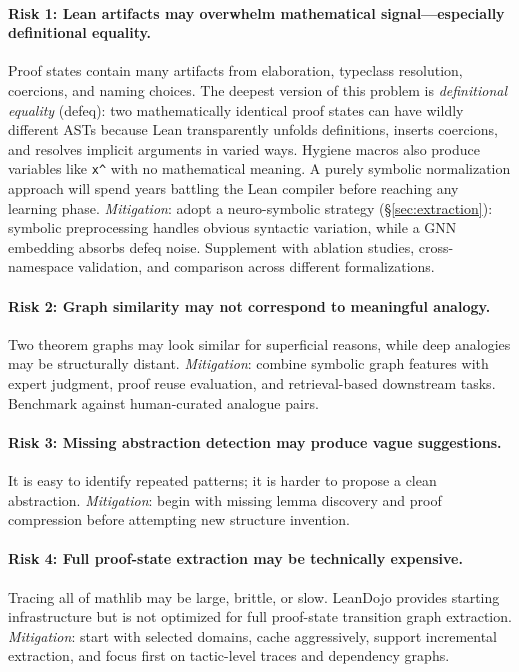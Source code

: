 \documentclass[12pt, a4paper]{article}
\begin{document}
\paragraph{Risk 1: Lean artifacts may overwhelm mathematical signal---especially definitional equality.}
Proof states contain many artifacts from elaboration, typeclass resolution,
coercions, and naming choices. The deepest version of this problem is
\emph{definitional equality} (defeq): two mathematically identical proof states
can have wildly different ASTs because Lean transparently unfolds definitions,
inserts coercions, and resolves implicit arguments in varied ways. Hygiene
macros also produce variables like \texttt{x\textasciicircum} with no
mathematical meaning. A purely symbolic normalization approach will spend
years battling the Lean compiler before reaching any learning phase.
\textit{Mitigation}: adopt a neuro-symbolic strategy (\S\ref{sec:extraction}):
symbolic preprocessing handles obvious syntactic variation, while a GNN
embedding absorbs defeq noise. Supplement with ablation studies,
cross-namespace validation, and comparison across different formalizations.

\paragraph{Risk 2: Graph similarity may not correspond to meaningful analogy.}
Two theorem graphs may look similar for superficial reasons, while deep
analogies may be structurally distant.
\textit{Mitigation}: combine symbolic graph features with expert judgment,
proof reuse evaluation, and retrieval-based downstream tasks. Benchmark
against human-curated analogue pairs.

\paragraph{Risk 3: Missing abstraction detection may produce vague suggestions.}
It is easy to identify repeated patterns; it is harder to propose a clean
abstraction.
\textit{Mitigation}: begin with missing lemma discovery and proof compression
before attempting new structure invention.

\paragraph{Risk 4: Full proof-state extraction may be technically expensive.}
Tracing all of mathlib may be large, brittle, or slow. LeanDojo
\citep{yang2023leandojo} provides starting infrastructure but is not
optimized for full proof-state transition graph extraction.
\textit{Mitigation}: start with selected domains, cache aggressively, support
incremental extraction, and focus first on tactic-level traces and dependency
graphs.
\end{document}
